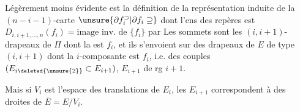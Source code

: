 Légèrement moins évidente est la définition de la représentation induite de la $(n-i-1)$-carte $\unsure{\partial f_i^{\supset}|\partial f_i\supseteq}$ dont l'ens des
repères est $D_{i,i+1,\ldots,n}(f_i)=\text{image inv. de }\{f_i\}$ par
 Les sommets sont les  $(i,i+1)$-drapeaux de $\Pi$ dont la  est $f_i$, et ils s'envoient sur des drapeaux de $E$ de type $(i,i+1)$ dont la $i$-composante est $f_i$,  i.e. des couples $(E_{i\deleted{\unsure{2}}}\subset E_{i+1})$, $E_{i+1}$ de rg $i+1$.

Mais si $V_i$ est l'espace des translations de $E_i$, les $E_{i+1}$ correspondent à des droites de $\overline{E}=E/V_i$.
